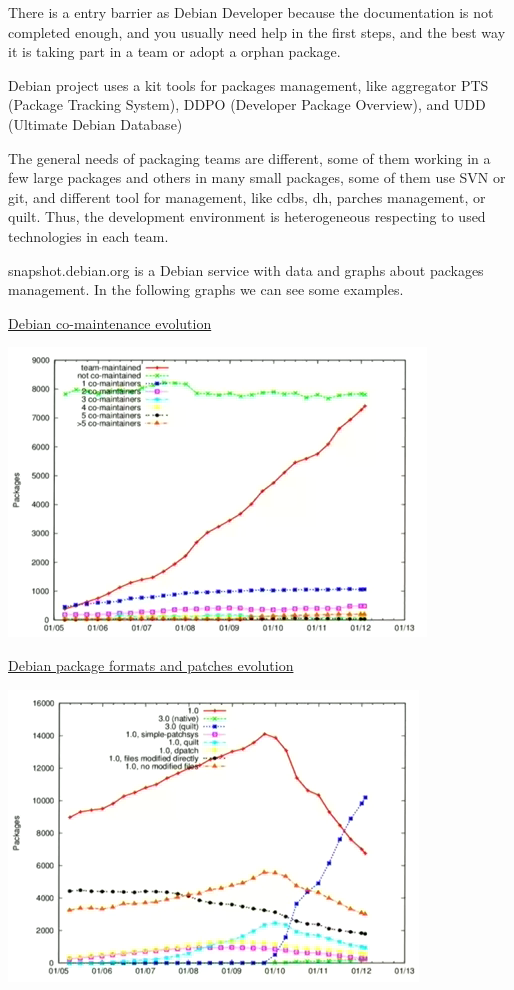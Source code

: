 \documentclass[11pt]{article}
\begin{document}
There is a entry barrier as Debian Developer because the documentation is not completed enough, and you usually need help in the first steps, and the best way it is taking part in a team or adopt a orphan package.

Debian project uses a kit tools for packages management, like aggregator PTS (Package Tracking System), DDPO (Developer Package Overview), and UDD (Ultimate Debian Database) 

The general needs of packaging teams are different, some of them working in a few large packages and others in many small packages, some of them use SVN or git, and different tool for management, like  cdbs, dh, parches management, or quilt.  Thus, the development environment is heterogeneous respecting to used technologies in each team. 

snapshot.debian.org is a Debian service with data and graphs about packages management. In the following graphs we can see some examples. 

\underline{Debian co-maintenance evolution}

\includegraphics[scale=0.7]{img/comaintenance}

\underline{Debian package formats and patches evolution }

\includegraphics[scale=0.7]{img/package-formats-patches}
\end{document}

